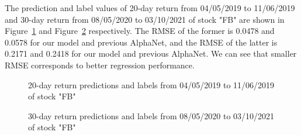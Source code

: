 \documentclass{article}
\begin{document}
\hspace{16}The prediction and label values of 20-day return from 04/05/2019 to 11/06/2019 and 30-day return from 08/05/2020 to 03/10/2021 of stock "FB" are shown in Figure~\ref{fig:label_pre_good} and Figure~\ref{fig:label_pre_bad} respectively. The RMSE of the former is 0.0478 and 0.0578 for our model and previous AlphaNet, and the RMSE of the latter is 0.2171 and 0.2418 for our model and previous AlphaNet. We can see that smaller RMSE corresponds to better regression performance.

\begin{figure}[htbp]
    \caption{20-day return predictions and labels from 04/05/2019 to 11/06/2019 of stock "FB"}
    \label{fig:label_pre_good}
\end{figure}

\begin{figure}[htbp]
    \caption{30-day return predictions and labels from 08/05/2020 to 03/10/2021 of stock "FB"}
    \label{fig:label_pre_bad}
\end{figure}
\end{document}
